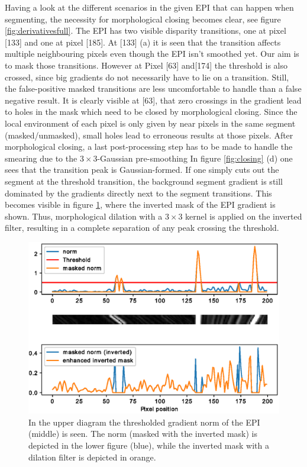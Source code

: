 \documentclass  [
  paper    = a4,
  BCOR     = 10mm,
  twoside,
  fontsize = 12pt,
  fleqn,
  toc      = bibnumbered,
  toc      = listofnumbered,
  numbers  = noendperiod,
  headings = normal,
  listof   = leveldown,
  version  = 3.03
]                                       {scrreprt}
\begin{document}
 Having a look at the different scenarios in the given EPI that can happen when segmenting, the necessity for morphological closing becomes clear, see figure \ref{fig:derivativesfull}. The EPI has two visible disparity transitions, one at pixel [133] and one at pixel [185]. At [133] (a) it is seen that the transition affects multiple neighbouring pixels even though the EPI isn't smoothed yet. Our aim is to mask those transitions. However at Pixel [63] and[174] the threshold is also crossed, since big gradients do not necessarily have to lie on a transition. Still, the false-positive masked transitions are less uncomfortable to handle than a false negative result. It is clearly visible at [63], that zero crossings in the gradient lead to holes in the mask which need to be closed by morphological closing. Since the local environment of each pixel is only given by near pixels in the same segment (masked/unmasked), small holes lead to erroneous results at those pixels. After morphological closing, a last post-processing step has to be made to handle the smearing due to the $3\times 3$-Gaussian pre-smoothing In figure \ref{fig:closing} (d) one sees that the transition peak is Gaussian-formed. If one simply cuts out the segment at the threshold transition, the background segment gradient is still dominated by the gradients directly next to the segment transitions. This becomes visible in figure \ref{fig:segmgaussian}, where the inverted mask of the EPI gradient is shown. Thus, morphological dilation with a $3\times3$ kernel is applied on the inverted filter, resulting in a complete separation of any peak crossing the threshold.
\begin{figure}[h!]
	\centering
	\includegraphics[width=1\linewidth]{images/segm_gaussian}
	\caption[Enhanced segmentation mask]{In the upper diagram the thresholded gradient norm of the EPI (middle) is seen. The norm (masked with the inverted mask) is depicted in the lower figure (blue), while the inverted mask with a dilation filter is depicted in orange.}
	\label{fig:segmgaussian}
\end{figure}
\end{document}
